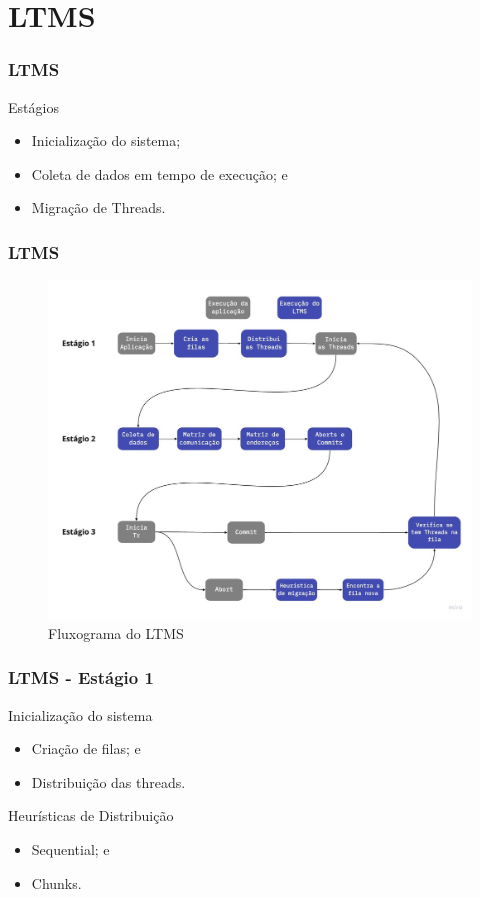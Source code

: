 \documentclass[10pt, pdf,xcolor=pdftex,dvipsnames,table]{beamer}
\begin{document}
\section{LTMS}
\begin{frame} \frametitle{LTMS}
    \begin{block}{Estágios}
        \begin{itemize}
        	\item Inicialização do sistema;
        	\item Coleta de dados em tempo de execução; e
        	\item Migração de Threads.
        \end{itemize}
    \end{block}
\end{frame}

\begin{frame} \frametitle{LTMS}
    \begin{figure}[!h]
        \centering
        \includegraphics[scale=0.2]{images/LTMS}
        \caption{Fluxograma do LTMS}
        \label{fig:abusy}
    \end{figure}
\end{frame}

\begin{frame} \frametitle{LTMS - Estágio 1}
    \begin{block}{Inicialização do sistema}
        \begin{itemize}
        	\item Criação de filas; e
        	\item Distribuição das threads.
        \end{itemize}
    \end{block}

    \begin{block}{Heurísticas de Distribuição}
        \begin{itemize}
        	\item Sequential; e
        	\item Chunks.
        \end{itemize}
    \end{block}
\end{frame}
\end{document}
